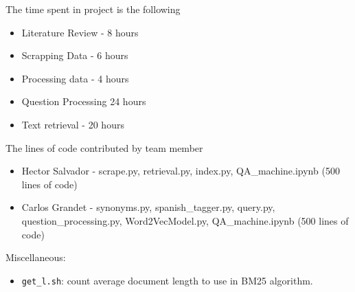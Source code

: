 \documentclass[letterpaper, margin=1in]{article}
\begin{document}
The time spent in project is the following
\begin{itemize}
\item Literature Review - 8 hours 
\item Scrapping Data - 6 hours 
\item Processing data - 4 hours
\item Question Processing 24 hours 
\item Text retrieval - 20 hours 
\end{itemize}

The lines of code contributed by team member
\begin{itemize}
\item Hector Salvador - scrape.py, retrieval.py, index.py, QA{\_}machine.ipynb (500 lines of code)
\item Carlos Grandet - synonyms.py, spanish{\_}tagger.py, query.py, question{\_}processing.py,
Word2VecModel.py, QA{\_}machine.ipynb (500 lines of code)
\end{itemize}

Miscellaneous:
\begin{itemize}
\item \texttt{get{\_}l.sh}: count average document length to use in BM25 algorithm.
\end{itemize}
\end{document}
